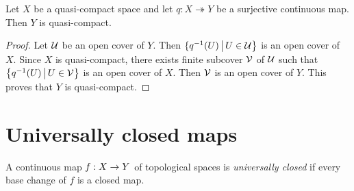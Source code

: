 \begin{proposition}\label{proposition:quasi-compact_spaces_are_preserved_by_continuous_images}
	Let $X$ be a quasi-compact space and let $q:X\twoheadrightarrow Y$ be a surjective continuous map. Then $Y$ is quasi-compact.
\end{proposition}
\begin{proof}
	Let ${\mathcal U}$ be an open cover of $Y$. Then $\{q^{-1}(U)\,\big|\,U \in {\mathcal U}\big\}$ is an open cover of $X$. Since $X$ is quasi-compact, there exists finite subcover ${\mathcal V}$ of ${\mathcal U}$ such that $\big\{q^{-1}(U)\,\big|\,U\in {\mathcal V}\big\}$ is an open cover of $X$. Then ${\mathcal V}$ is an open cover of $Y$. This proves that $Y$ is quasi-compact.
\end{proof}


\section{Universally closed maps}

\begin{definition}
	A continuous map $f:X\rightarrow Y$ of topological spaces is \textit{universally closed} if every base change of $f$ is a closed map.
\end{definition}

